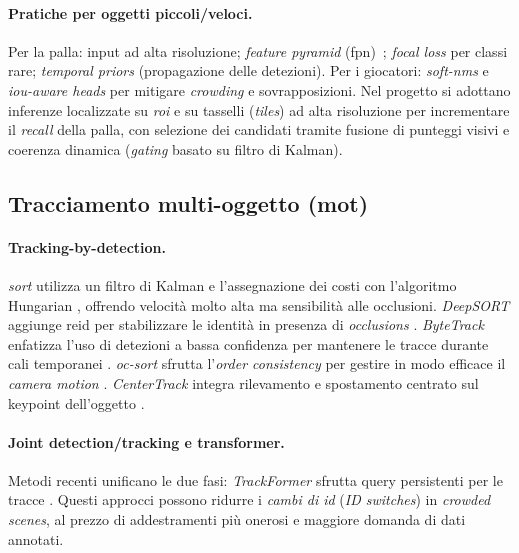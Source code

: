 \documentclass[12pt,a4paper,openright,twoside]{book}
\begin{document}
\paragraph{Pratiche per oggetti piccoli/veloci.} Per la palla: 
input ad alta risoluzione; \emph{feature pyramid} (\ac{fpn})~\cite{Lin2017Feature, Liu2018Path};
\emph{focal loss} per classi rare; \emph{temporal priors} 
(propagazione delle detezioni). Per i giocatori: \emph{soft-\ac{nms}} e
\emph{\ac{iou}-aware heads} per mitigare \emph{crowding} e sovrapposizioni. 
Nel progetto si adottano inferenze localizzate su \emph{\ac{roi}} e su 
tasselli (\emph{tiles}) ad alta risoluzione per incrementare il 
\emph{recall} della palla, con selezione dei candidati tramite fusione 
di punteggi visivi e coerenza dinamica (\emph{gating} basato su filtro di Kalman).

\subsection{Tracciamento multi-oggetto (\ac{mot})}

\paragraph{Tracking-by-detection.} \emph{\ac{sort}} utilizza un filtro di 
Kalman e l'assegnazione dei costi con l'algoritmo Hungarian \cite{Kuhn1955HungarianMethod, 
Munkres1957Assignment}, offrendo velocità molto alta ma sensibilità alle occlusioni. 
\emph{DeepSORT} aggiunge \ac{reid} per stabilizzare le identità in presenza 
di \emph{occlusions} \cite{Wojke2017DeepSort}. 
\emph{ByteTrack} enfatizza l'uso di detezioni a bassa confidenza per mantenere le 
tracce durante cali temporanei \cite{Wang2021TransformerTracker}.
\emph{\ac{oc-sort}} sfrutta l'\emph{order consistency} per gestire in modo efficace il 
\emph{camera motion} \cite{Ye2022OSTrack}. 
\emph{CenterTrack} integra rilevamento e spostamento centrato sul keypoint 
dell'oggetto \cite{Zhou2020TrackingObjects}.

\paragraph{Joint detection/tracking e transformer.} Metodi recenti unificano le 
due fasi: \emph{TrackFormer} sfrutta query persistenti per le tracce 
\cite{Meinhardt2021TrackFormer}. Questi approcci possono ridurre i 
\emph{cambi di \ac{id}} (\emph{ID switches}) in \emph{crowded scenes}, 
al prezzo di addestramenti più onerosi e maggiore domanda di dati annotati.
\end{document}
